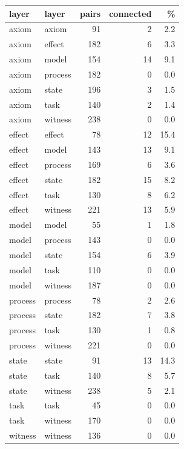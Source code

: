 \begin{longtable}{@{}llrrr@{}}\toprule
layer & layer & pairs & connected & \% \\\midrule\endhead
axiom & axiom & 91 & 2 & 2.2 \\
axiom & effect & 182 & 6 & 3.3 \\
axiom & model & 154 & 14 & 9.1 \\
axiom & process & 182 & 0 & 0.0 \\
axiom & state & 196 & 3 & 1.5 \\
axiom & task & 140 & 2 & 1.4 \\
axiom & witness & 238 & 0 & 0.0 \\
effect & effect & 78 & 12 & 15.4 \\
effect & model & 143 & 13 & 9.1 \\
effect & process & 169 & 6 & 3.6 \\
effect & state & 182 & 15 & 8.2 \\
effect & task & 130 & 8 & 6.2 \\
effect & witness & 221 & 13 & 5.9 \\
model & model & 55 & 1 & 1.8 \\
model & process & 143 & 0 & 0.0 \\
model & state & 154 & 6 & 3.9 \\
model & task & 110 & 0 & 0.0 \\
model & witness & 187 & 0 & 0.0 \\
process & process & 78 & 2 & 2.6 \\
process & state & 182 & 7 & 3.8 \\
process & task & 130 & 1 & 0.8 \\
process & witness & 221 & 0 & 0.0 \\
state & state & 91 & 13 & 14.3 \\
state & task & 140 & 8 & 5.7 \\
state & witness & 238 & 5 & 2.1 \\
task & task & 45 & 0 & 0.0 \\
task & witness & 170 & 0 & 0.0 \\
witness & witness & 136 & 0 & 0.0 \\
\bottomrule\end{longtable}
